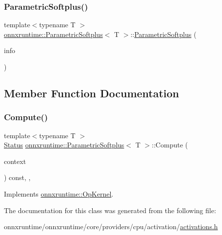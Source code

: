 \subsubsection{\texorpdfstring{Parametric\+Softplus()}{ParametricSoftplus()}}
{\footnotesize\ttfamily template$<$typename T $>$ \\
\mbox{\hyperlink{classonnxruntime_1_1ParametricSoftplus}{onnxruntime\+::\+Parametric\+Softplus}}$<$ T $>$\+::\mbox{\hyperlink{classonnxruntime_1_1ParametricSoftplus}{Parametric\+Softplus}} (\begin{DoxyParamCaption}\item[{const \mbox{\hyperlink{classonnxruntime_1_1OpKernelInfo}{Op\+Kernel\+Info}} \&}]{info }\end{DoxyParamCaption})\hspace{0.3cm}{\ttfamily [inline]}}



\subsection{Member Function Documentation}
\mbox{\label{classonnxruntime_1_1ParametricSoftplus_af14529649d60d13215bde30520a59554}} 
\subsubsection{\texorpdfstring{Compute()}{Compute()}}
{\footnotesize\ttfamily template$<$typename T $>$ \\
\mbox{\hyperlink{classonnxruntime_1_1common_1_1Status}{Status}} \mbox{\hyperlink{classonnxruntime_1_1ParametricSoftplus}{onnxruntime\+::\+Parametric\+Softplus}}$<$ T $>$\+::Compute (\begin{DoxyParamCaption}\item[{\mbox{\hyperlink{classonnxruntime_1_1OpKernelContext}{Op\+Kernel\+Context}} $\ast$}]{context }\end{DoxyParamCaption}) const\hspace{0.3cm}{\ttfamily [inline]}, {\ttfamily [override]}, {\ttfamily [virtual]}}



Implements \mbox{\hyperlink{classonnxruntime_1_1OpKernel_a9eca8656a78b1b3ab9d3351a12798650}{onnxruntime\+::\+Op\+Kernel}}.



The documentation for this class was generated from the following file\+:\begin{DoxyCompactItemize}
\item 
onnxruntime/onnxruntime/core/providers/cpu/activation/\mbox{\hyperlink{cpu_2activation_2activations_8h}{activations.\+h}}\end{DoxyCompactItemize}
